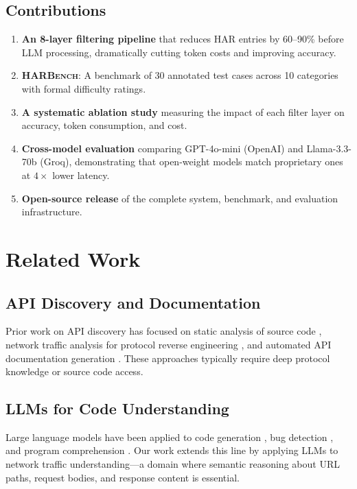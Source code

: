 \documentclass[10pt,twocolumn]{article}
\begin{document}
\subsection{Contributions}

\begin{enumerate}[nosep]
  \item \textbf{An 8-layer filtering pipeline} that reduces HAR entries by 60--90\% before LLM processing, dramatically cutting token costs and improving accuracy.
  \item \textbf{\textsc{HARBench}}: A benchmark of 30 annotated test cases across 10 categories with formal difficulty ratings.
  \item \textbf{A systematic ablation study} measuring the impact of each filter layer on accuracy, token consumption, and cost.
  \item \textbf{Cross-model evaluation} comparing GPT-4o-mini (OpenAI) and Llama-3.3-70b (Groq), demonstrating that open-weight models match proprietary ones at $4\times$ lower latency.
  \item \textbf{Open-source release} of the complete system, benchmark, and evaluation infrastructure.
\end{enumerate}

\section{Related Work}

\subsection{API Discovery and Documentation}

Prior work on API discovery has focused on static analysis of source code \citep{wittern2017}, network traffic analysis for protocol reverse engineering \citep{comparetti2009}, and automated API documentation generation \citep{sohan2015}. These approaches typically require deep protocol knowledge or source code access.

\subsection{LLMs for Code Understanding}

Large language models have been applied to code generation \citep{chen2021,li2023}, bug detection \citep{pearce2022}, and program comprehension \citep{nam2024}. Our work extends this line by applying LLMs to network traffic understanding---a domain where semantic reasoning about URL paths, request bodies, and response content is essential.
\end{document}
